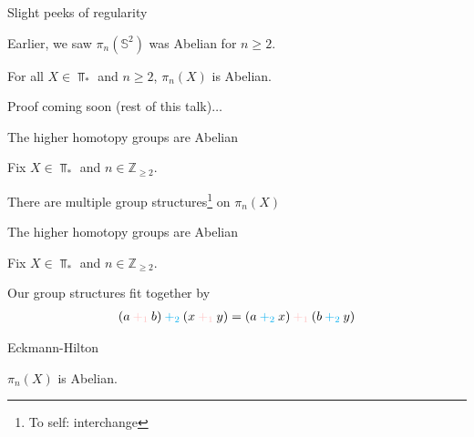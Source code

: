 \begin{frame}{Slight peeks of regularity} %

  \par Earlier, we saw $\pi_n (\mathbb{S}^2)$ was Abelian for $n \geq 2$.
  \vspace{\baselineskip}
  \par{} For all $X \in \Top_{*}$ and $n \geq 2$, $\pi_n (X)$ is Abelian.
  \vspace{\baselineskip}
  \par Proof coming soon (rest of this talk)$\dots$
  
\end{frame}

\begin{frame}[t]{The higher homotopy groups are Abelian} %

  \par Fix $X \in \Top_{*}$ and $n \in \mathbb{Z}_{\geq 2}$.
  \par{} There are multiple group structures\footnote{To self: interchange} on $\pi_n (X)$
  
\end{frame}

\begin{frame}[t]{The higher homotopy groups are Abelian} %

  \par Fix $X \in \Top_{*}$ and $n \in \mathbb{Z}_{\geq 2}$.
  \par Our group structures fit together by
  \begin{align*}
    (a \mathbin{\textcolor{pink}{+_1}} b)
    \mathbin{\textcolor{cyan}{+_2}}
    (x \mathbin{\textcolor{pink}{+_1}} y)
    = (a \mathbin{\textcolor{cyan}{+_2}} x)
    \mathbin{\textcolor{pink}{+_1}}
    (b \mathbin{\textcolor{cyan}{+_2}} y)
  \end{align*}

  \vspace{2 \baselineskip}
  \par{} Eckmann-Hilton

  \vspace{8 \baselineskip}
  \par{} $\pi_n (X)$ is Abelian.
  
\end{frame}

